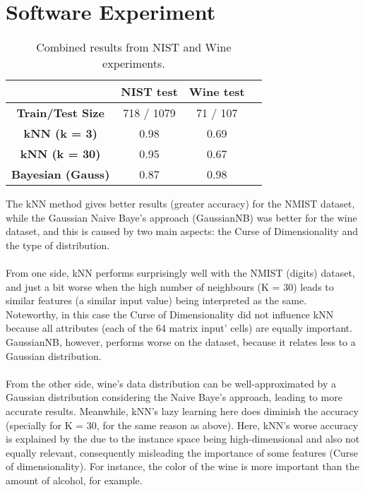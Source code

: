 \documentclass{article}
\begin{document}
\section{Software Experiment} 
\begin{table}[h!]
\centering
\begin{tabular}{|c|c|c|c|}
\hline
\textbf{}          & \textbf{NIST test} & \textbf{Wine test} \\ \hline
\textbf{Train/Test Size} & 718 / 1079 & 71 / 107                \\ \hline
\textbf{kNN (k = 3)}     & 0.98                     & 0.69                     \\ \hline
\textbf{kNN (k = 30)}    & 0.95                     & 0.67                     \\ \hline
\textbf{Bayesian (Gauss)}& 0.87                     & 0.98                     \\ \hline
\end{tabular}
\caption{Combined results from NIST and Wine experiments.}
\end{table}

The kNN method gives better results (greater accuracy) for the NMIST dataset, while the Gaussian Naive Baye's approach (GaussianNB) was better for the wine dataset, and this is caused by two main aspects: the Curse of Dimensionality and the type of distribution.
\\
\\
From one side, kNN performs surprisingly well with the NMIST (digits) dataset, and just a bit worse when the high number of neighbours (K = 30) leads to similar features (a similar input value) being interpreted as the same. Noteworthy, in this case the Curse of Dimensionality did not influence kNN because all attributes (each of the 64 matrix input' cells) are equally important. GaussianNB, however, performs worse on the dataset, because it relates less to a Gaussian distribution. 
\\
\\
From the other side, wine's data distribution can be well-approximated by a Gaussian distribution considering the Naive Baye's approach, leading to more accurate results. Meanwhile, kNN's lazy learning here does diminish the accuracy (specially for K = 30, for the same reason as above). Here, kNN's worse accuracy is explained by the due to the instance space being high-dimensional and also not equally relevant, consequently misleading the importance of some features (Curse of dimensionality). For instance, the color of the wine is more important than the amount of alcohol, for example.







\newpage
\end{document}
